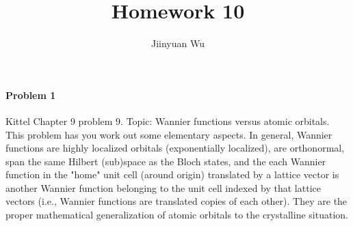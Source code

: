 \documentclass[hyperref, a4paper]{article}
\title{Homework 10}
\author{Jiinyuan Wu}
\begin{document}
\maketitle

\paragraph{Problem 1} Kittel Chapter 9 problem 9. Topic: Wannier functions versus atomic orbitals. This problem has you work out some elementary aspects. In general, Wannier functions are highly localized orbitals (exponentially localized), are orthonormal, span the same Hilbert (sub)space as the Bloch states, and the each Wannier function in the "home" unit cell (around origin) translated by a lattice vector is another Wannier function belonging to the unit cell indexed by that lattice vectors (i.e., Wannier functions are translated copies of each other). They are the proper mathematical generalization of atomic orbitals to the crystalline situation.
\end{document}
